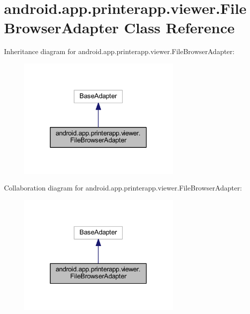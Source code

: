 \hypertarget{classandroid_1_1app_1_1printerapp_1_1viewer_1_1_file_browser_adapter}{}\section{android.\+app.\+printerapp.\+viewer.\+File\+Browser\+Adapter Class Reference}
\label{classandroid_1_1app_1_1printerapp_1_1viewer_1_1_file_browser_adapter}


Inheritance diagram for android.\+app.\+printerapp.\+viewer.\+File\+Browser\+Adapter\+:
\nopagebreak
\begin{figure}[H]
\begin{center}
\leavevmode
\includegraphics[width=225pt]{classandroid_1_1app_1_1printerapp_1_1viewer_1_1_file_browser_adapter__inherit__graph}
\end{center}
\end{figure}


Collaboration diagram for android.\+app.\+printerapp.\+viewer.\+File\+Browser\+Adapter\+:
\nopagebreak
\begin{figure}[H]
\begin{center}
\leavevmode
\includegraphics[width=225pt]{classandroid_1_1app_1_1printerapp_1_1viewer_1_1_file_browser_adapter__coll__graph}
\end{center}
\end{figure}
